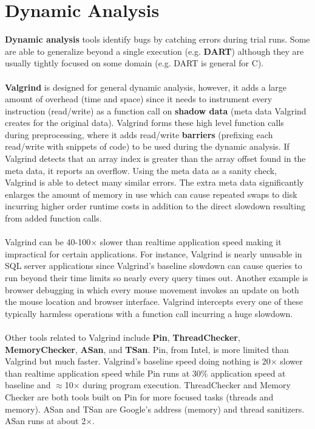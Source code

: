\documentclass[twoside]{article}
\begin{document}
\section{Dynamic Analysis}
\textbf{Dynamic analysis} tools identify bugs by catching errors during trial runs.  Some are able to generalize beyond a single execution (e.g. \textbf{DART}) although they are usually tightly focused on some domain (e.g. DART is general for C).\\
\\
\textbf{Valgrind} is designed for general dynamic analysis, however, it adds a large amount of overhead (time and space) since it needs to instrument every instruction (read/write) as a function call on \textbf{shadow data} (meta data Valgrind creates for the original data).  Valgrind forms these high level function calls during preprocessing, where it adds read/write \textbf{barriers} (prefixing each read/write with snippets of code) to be used during the dynamic analysis.  If Valgrind detects that an array index is greater than the array offset found in the meta data, it reports an overflow.  Using the meta data as a sanity check, Valgrind is able to detect many similar errors.  The extra meta data significantly enlarges the amount of memory in use which can cause repeated swaps to disk incurring higher order runtime costs in addition to the direct slowdown resulting from added function calls.\\
\\
Valgrind can be 40-100$\times$ slower than realtime application speed making it impractical for certain applications.  For instance, Valgrind is nearly unusable in SQL server applications since Valgrind's baseline slowdown can cause queries to run beyond their time limits so nearly every query times out.  Another example is browser debugging in which every mouse movement invokes an update on both the mouse location and browser interface.  Valgrind intercepts every one of these typically harmless operations with a function call incurring a huge slowdown.\\
\\
Other tools related to Valgrind include \textbf{Pin}, \textbf{ThreadChecker}, \textbf{MemoryChecker}, \textbf{ASan}, and \textbf{TSan}.  Pin, from Intel, is more limited than Valgrind but much faster.  Valgrind's baseline speed doing nothing is 20$\times$ slower than realtime application speed while Pin runs at 30\% application speed at baseline and $\approx$10$\times$ during program execution.  ThreadChecker and Memory Checker are both tools built on Pin for more focused tasks (threads and memory).  ASan and TSan are Google's address (memory) and thread sanitizers.  ASan runs at about 2$\times$.\\
\end{document}
